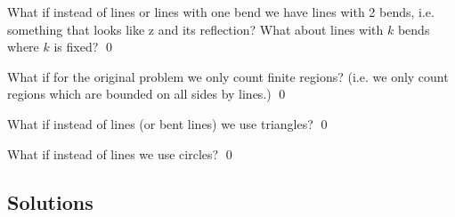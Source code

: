 \newpage
\begin{ex}
  What if instead of lines or lines with one bend we have
  lines with 2 bends, i.e. something that looks like z and its reflection?
 What about lines with $k$ bends where $k$ is fixed?
  \qed
\end{ex}
  
\newpage
\begin{ex}
What if for the original problem we only count finite regions?
(i.e. we only count regions which are bounded on all sides by lines.)
\qed
\end{ex}

\newpage
\begin{ex}
What if instead of lines (or bent lines) we use
triangles?
\qed
\end{ex}


\newpage
\begin{ex}
What if instead of lines we use circles?
\qed
\end{ex}

\newpage
\subsection*{Solutions}

